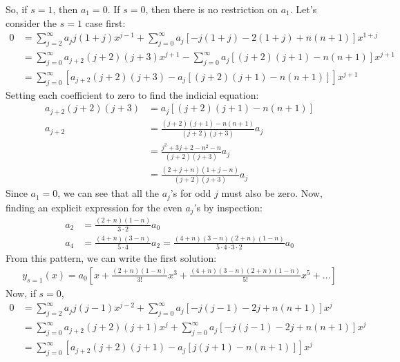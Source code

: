 \documentclass{article}
\begin{document}
So, if $s = 1$, then $a_1 = 0$. If $s = 0$, then there is no restriction on $a_1$. Let's consider the $s=1$ case first:
\begin{equation*}
\begin{aligned}
	0 &= \sum_{j=2}^\infty a_j j(1+j) x^{j-1} + \sum_{j=0}^\infty a_j\left[-j(1+j)-2(1+j)+n(n+1)\right]x^{1+j} \\
	&= \sum_{j=0}^\infty a_{j+2} (j+2)(j+3) x^{j+1} - \sum_{j=0}^\infty a_j\left[(j+2)(j+1)-n(n+1)\right]x^{j+1} \\
	&= \sum_{j=0}^\infty \left[a_{j+2}(j+2)(j+3) - a_j\left[(j+2)(j+1) - n(n+1)\right]\right]x^{j+1}
\end{aligned}
\end{equation*}
Setting each coefficient to zero to find the indicial equation:
\begin{equation*}
\begin{aligned}
	a_{j+2}(j+2)(j+3) &= a_j\left[(j+2)(j+1) - n(n+1)\right] \\
	a_{j+2} &= \frac{(j+2)(j+1)-n(n+1)}{(j+2)(j+3)}a_j \\
	&= \frac{j^2+3j+2-n^2-n}{(j+2)(j+3)}a_j \\
	&= \frac{(2+j+n)(1+j-n)}{(j+2)(j+3)}a_j
\end{aligned}
\end{equation*}
Since $a_1 = 0$, we can see that all the $a_j$'s for odd $j$ must also be zero. Now, finding an explicit expression for the even $a_j$'s by inspection:
\begin{equation*}
\begin{aligned}
	a_2 &= \frac{(2+n)(1-n)}{3\cdot 2}a_0 \\
	a_4 &= \frac{(4+n)(3-n)}{5\cdot 4}a_2 = \frac{(4+n)(3-n)(2+n)(1-n)}{5\cdot 4\cdot 3\cdot 2}a_0
\end{aligned}
\end{equation*}
From this pattern, we can write the first solution:
\begin{equation*}
\begin{aligned}
	y_{s=1}(x) = a_0\left[x + \frac{(2+n)(1-n)}{3!}x^3 + \frac{(4+n)(3-n)(2+n)(1-n)}{5!}x^5+\dots\right]
\end{aligned}
\end{equation*}
Now, if $s=0$, 
\begin{equation*}
\begin{aligned}
	0 &= \sum_{j=2}^\infty a_j j(j-1) x^{j-2} + \sum_{j=0}^\infty a_j\left[-j(j-1)-2j+n(n+1)\right]x^{j} \\
	&= \sum_{j=0}^\infty a_{j+2} (j+2)(j+1) x^{j} + \sum_{j=0}^\infty a_j\left[-j(j-1)-2j+n(n+1)\right]x^{j} \\
	&= \sum_{j=0}^\infty \left[a_{j+2}(j+2)(j+1) - a_j[j(j+1)-n(n+1)]\right]x^j
\end{aligned}
\end{equation*}
\end{document}
